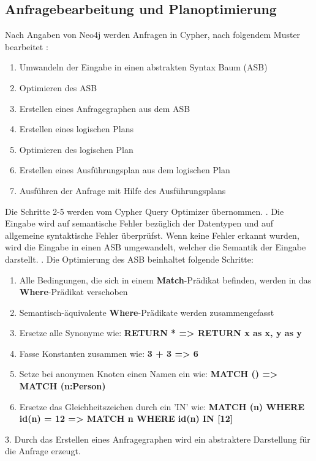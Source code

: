 \subsection{Anfragebearbeitung und Planoptimierung}
Nach Angaben von Neo4j werden Anfragen in Cypher, nach folgendem Muster bearbeitet \parencite{Optimizer}:
\begin{enumerate}
	\item Umwandeln der Eingabe in einen abstrakten Syntax Baum (ASB)
	\item Optimieren des ASB
	\item Erstellen eines Anfragegraphen aus dem ASB
	\item Erstellen eines logischen Plans
	\item Optimieren des logischen Plan 
	\item Erstellen eines Ausführungsplan aus dem logischen Plan
	\item Ausführen der Anfrage mit Hilfe des Ausführungsplans  
\end{enumerate}
Die Schritte 2-5 werden vom Cypher Query Optimizer übernommen. \newline {}. Die Eingabe wird auf semantische Fehler bezüglich der Datentypen und auf allgemeine syntaktische Fehler überprüfst. Wenn keine Fehler erkannt wurden, wird die Eingabe in einen ASB umgewandelt, welcher die Semantik der Eingabe darstellt. \newline
{}. Die Optimierung des ASB beinhaltet folgende Schritte: 
\begin{enumerate}[label=(\roman*)]
	\item Alle Bedingungen, die sich in einem \textbf{Match}-Prädikat befinden, werden in das \textbf{Where}-Prädikat verschoben
	\item  Semantisch-äquivalente \textbf{Where}-Prädikate werden zusammengefasst
	\item Ersetze alle Synonyme wie: \textbf{RETURN * => RETURN x as x, y as y}
	\item Fasse Konstanten zusammen wie: \textbf{3 + 3 => 6}
	\item Setze bei anonymen Knoten einen Namen ein  wie: \textbf{ MATCH () => MATCH (n:Person)}
	\item Ersetze das Gleichheitszeichen durch ein 'IN' wie: \textbf{MATCH (n) WHERE id(n) = 12 => MATCH n WHERE id(n) IN [12]}
\end{enumerate}
3. Durch das Erstellen eines Anfragegraphen wird ein abstraktere Darstellung für die Anfrage erzeugt.\newline \newline
